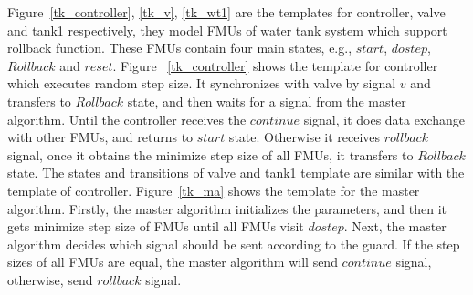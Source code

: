 \begin{figure}[htbp]
\end{figure}

Figure~\ref{tk_controller}, \ref{tk_v}, \ref{tk_wt1} are the templates for controller, valve and tank1 respectively, they model FMUs of water tank system which support rollback function. These FMUs contain four main states, e.g., $start$, $dostep$, $Rollback$ and $reset$. Figure~ \ref{tk_controller} shows the template for controller which executes random step size. It synchronizes with valve by signal $v$ and transfers to $Rollback$ state, and then waits for a signal from the master algorithm. Until the controller receives the $continue$ signal, it does data exchange with other FMUs, and returns to $start$ state. Otherwise it receives $rollback$ signal, once it obtains the minimize step size of all FMUs, it transfers to $Rollback$ state. The states and transitions of valve and tank1 template are similar with the template of controller. Figure~\ref{tk_ma} shows the template for the master algorithm. Firstly, the master algorithm initializes the parameters, and then it gets minimize step size of FMUs until all FMUs visit $dostep$. Next, the master algorithm decides which signal should be sent according to the guard. If the step sizes of all FMUs are equal, the master algorithm will send $continue$ signal, otherwise, send $rollback$ signal.

